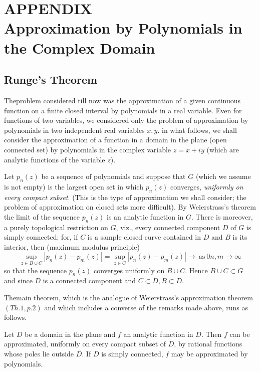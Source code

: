
\chapter*{APPENDIX \\ Approximation by Polynomials in the Complex
  Domain}

\setcounter{section}{0}
\section{Runge's Theorem}

The\pageoriginale problem considered till now was the approximation of a given
continuous function on a finite closed interval by polynomials in a
real variable. Even for functions of two variables, we considered only
the problem of approximation by polynomials in two independent real
variables $x,y$. in what follows, we shall consider the approximation
of a function in a domain in the plane (open connected set) by
polynomials in the complex variable $z=x+iy$ (which are analytic
functions of the variable $z$).

Let $p_n(z)$ be a sequence of polynomials and suppose that $G$ (which
we assume is not empty) is the largest open  set in which $p_n(z)$
converges, \textit{uniformly on every compact subset}. (This is the
type of approximation  we shall consider; the problem of approximation
on closed sets more difficult). By Weierstrass's theorem the limit of
the sequence $p_n(z)$ is an analytic function in $G$.  There is
moreover, a purely topological restriction on $G$, viz., every
connected component $D$ of $G$ is simply connected: for, if $C$ is a
sample closed curve contained in $D$ and $B$ is its interior, then
(maximum modulus principle)  
$$
\sup_{z \in  B \cup C} | p_n(z) - p_m(z)  | = \sup_{z \in C} | p_n(z)-
p_m(z) | \to ~\text{as}~0 n,m \to \infty 
$$
so that the sequence $p_n(z)$ converges uniformly on $B \cup C$. Hence
$B \cup C \subset G$ and since $D$ is a connected component and $C
\subset D, B \subset D$. 

The\pageoriginale main theorem, which is the analogue of Weierstrass's approximation
theorem $(Th. 1, p.2)$ and which includes a converse of the remarks
made above, runs as follows. 

\begin{theorem*}[{\bf A (Runge)}]
  Let $D$ be a domain in the plane  and $f$ an analytic
  function in $D$. Then $f$ can be approximated, uniformly on every
  compact subset of $D$, by rational functions whose poles lie outside
  $D$. If  $D$ is simply  connected, $f$ may be approximated by
  polynomials. 
\end{theorem*}

